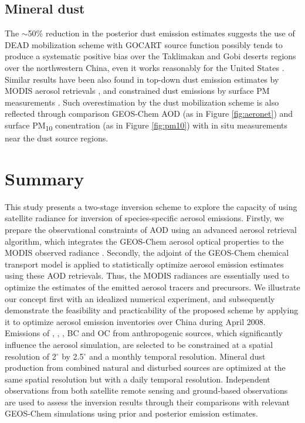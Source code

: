  \subsection{Mineral dust} 

  The $\sim$50\% reduction in the posterior dust emission estimates suggests the use of DEAD mobilization scheme with GOCART source function possibly tends to produce a systematic positive bias over the Taklimakan and Gobi deserts regions over the northwestern China, 
even it works reasonably for the United States \citep{fairlie07}. 
Similar results have been also found in top-down dust emission estimates by MODIS aerosol retrievals \citep{wang12}, 
and constrained dust emissions by surface PM measurements \citep{ku11}. 
Such overestimation by the dust mobilization scheme is also reflected through comparison GEOS-Chem AOD 
(as in Figure \ref{fig:aeronet}) and surface PM\textsubscript{10} conentration (as in Figure \ref{fig:pm10}) with in situ measurements near the dust source regions. 


\section{Summary} \label{sec:invsummary}

 This study presents a two-stage inversion scheme to explore the capacity of using satellite radiance for inversion of species-specific aerosol emissions.
 Firstly, we prepare the observational constraints of AOD using an advanced aerosol retrieval algorithm,
 which integrates the GEOS-Chem aerosol optical properties to the MODIS observed radiance \citep{wang10}.
 Secondly, the adjoint of the GEOS-Chem chemical transport model is applied to statistically optimize aerosol emission estimates using these AOD retrievals.
 Thus, the MODIS radiances are essentially used to optimize the estimates of the emitted aerosol tracers and precursors.
 We illustrate our concept first with an idealized numerical experiment,
 and subsequently demonstrate the feasibility and practicability of the proposed scheme by applying it to optimize aerosol emission inventories over China during April 2008.
 Emissions of , , , BC and OC from anthropogenic sources,
 which significantly influence the aerosol simulation, are selected to be constrained at a spatial resolution of 2$^{\circ}$ by 2.5$^{\circ}$ and a monthly temporal resolution.
 Mineral dust production from combined natural and disturbed sources are optimized at the same spatial resolution but with a daily temporal resolution.
 Independent observations from both satellite remote sensing and ground-based observations are used to assess the inversion results through their comparisons with relevant GEOS-Chem simulations using prior and posterior emission estimates. 

